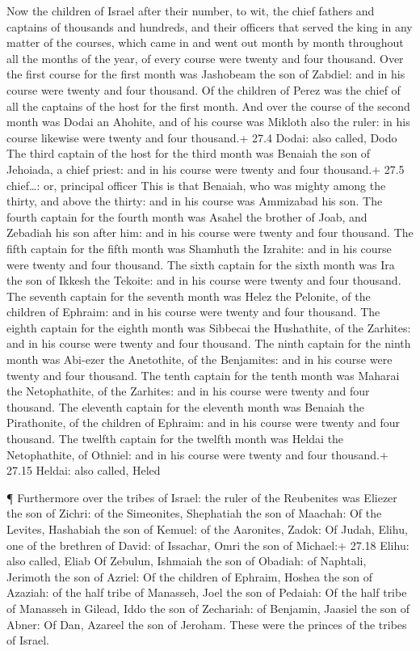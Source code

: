  Now the children of Israel after their number, to wit, the
chief fathers and captains of thousands and hundreds, and their officers
that served the king in any matter of the courses, which came in and
went out month by month throughout all the months of the year, of every
course were twenty and four thousand.  Over the first course
for the first month was Jashobeam the son of Zabdiel: and in his course
were twenty and four thousand.  Of the children of Perez was
the chief of all the captains of the host for the first month.
 And over the course of the second month was Dodai an
Ahohite, and of his course was Mikloth also the ruler: in his course
likewise were twenty and four thousand.+ 27.4 Dodai: also called, Dodo
 The third captain of the host for the third month was
Benaiah the son of Jehoiada, a chief priest: and in his course were
twenty and four thousand.+ 27.5 chief\ldots: or, principal officer
 This is that Benaiah, who was mighty among the thirty, and
above the thirty: and in his course was Ammizabad his son. 
The fourth captain for the fourth month was Asahel the brother of Joab,
and Zebadiah his son after him: and in his course were twenty and four
thousand.  The fifth captain for the fifth month was
Shamhuth the Izrahite: and in his course were twenty and four thousand.
 The sixth captain for the sixth month was Ira the son of
Ikkesh the Tekoite: and in his course were twenty and four thousand.
 The seventh captain for the seventh month was Helez the
Pelonite, of the children of Ephraim: and in his course were twenty and
four thousand.  The eighth captain for the eighth month was
Sibbecai the Hushathite, of the Zarhites: and in his course were twenty
and four thousand.  The ninth captain for the ninth month
was Abi-ezer the Anetothite, of the Benjamites: and in his course were
twenty and four thousand.  The tenth captain for the tenth
month was Maharai the Netophathite, of the Zarhites: and in his course
were twenty and four thousand.  The eleventh captain for
the eleventh month was Benaiah the Pirathonite, of the children of
Ephraim: and in his course were twenty and four thousand. 
The twelfth captain for the twelfth month was Heldai the Netophathite,
of Othniel: and in his course were twenty and four thousand.+ 27.15
Heldai: also called, Heled

 ¶ Furthermore over the tribes of Israel: the ruler of the
Reubenites was Eliezer the son of Zichri: of the Simeonites, Shephatiah
the son of Maachah:  Of the Levites, Hashabiah the son of
Kemuel: of the Aaronites, Zadok:  Of Judah, Elihu, one of
the brethren of David: of Issachar, Omri the son of Michael:+ 27.18
Elihu: also called, Eliab  Of Zebulun, Ishmaiah the son of
Obadiah: of Naphtali, Jerimoth the son of Azriel:  Of the
children of Ephraim, Hoshea the son of Azaziah: of the half tribe of
Manasseh, Joel the son of Pedaiah:  Of the half tribe of
Manasseh in Gilead, Iddo the son of Zechariah: of Benjamin, Jaasiel the
son of Abner:  Of Dan, Azareel the son of Jeroham. These
were the princes of the tribes of Israel.

